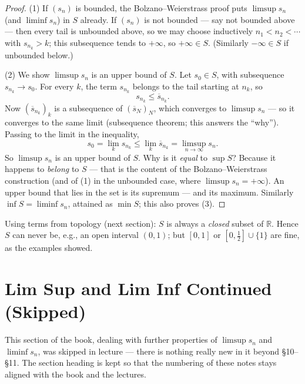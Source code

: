 \documentclass[11pt]{report}
\begin{document}
\begin{proof}
(1) If $(s_n)$ is bounded, the Bolzano--Weierstrass proof puts $\limsup s_n$ (and $\liminf s_n$) in $S$ already. If $(s_n)$ is not bounded --- say not bounded above --- then every tail is unbounded above, so we may choose inductively $n_1 < n_2 < \cdots$ with $s_{n_k} > k$; this subsequence tends to $+\infty$, so $+\infty \in S$. (Similarly $-\infty \in S$ if unbounded below.)

(2) We show $\limsup s_n$ is an upper bound of $S$. Let $s_0 \in S$, with subsequence $s_{n_k} \to s_0$. For every $k$, the term $s_{n_k}$ belongs to the tail starting at $n_k$, so
\[
s_{n_k} \leq \overline{s}_{n_k}.
\]
Now $(\overline{s}_{n_k})_k$ is a subsequence of $(\overline{s}_N)_N$, which converges to $\limsup s_n$ --- so it converges to the same limit (subsequence theorem; this answers the ``why''). Passing to the limit in the inequality,
\[
s_0 = \lim_k s_{n_k} \leq \lim_k \overline{s}_{n_k} = \limsup_{n\to\infty} s_n.
\]
So $\limsup s_n$ is an upper bound of $S$. Why is it \emph{equal} to $\sup S$? Because it happens to \emph{belong} to $S$ --- that is the content of the Bolzano--Weierstrass construction (and of (1) in the unbounded case, where $\limsup s_n = +\infty$). An upper bound that lies in the set is its supremum --- and its maximum. Similarly $\inf S = \liminf s_n$, attained as $\min S$; this also proves (3).
\end{proof}

\begin{rembox}
Using terms from topology (next section): $S$ is always a \emph{closed} subset of $\mathbb{R}$. Hence $S$ can never be, e.g., an open interval $(0,1)$; but $[0,1]$ or $[0,\tfrac12] \cup \{1\}$ are fine, as the examples showed.
\end{rembox}


\section{Lim Sup and Lim Inf Continued (Skipped)}

This section of the book, dealing with further properties of $\limsup s_n$ and $\liminf s_n$, was skipped in lecture --- there is nothing really new in it beyond \S 10--\S 11. The section heading is kept so that the numbering of these notes stays aligned with the book and the lectures.
\end{document}
